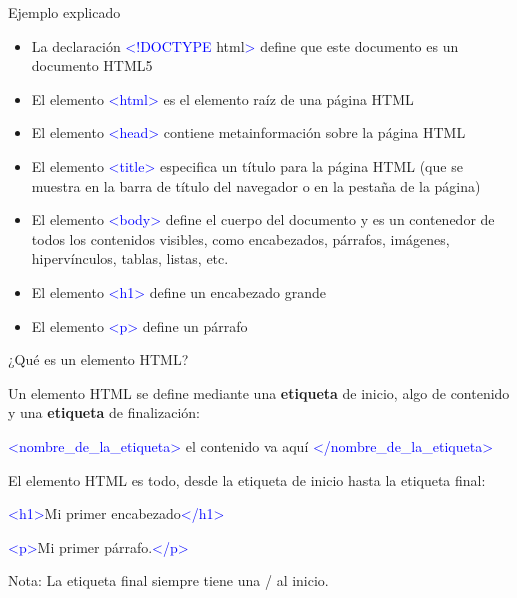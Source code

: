 \begin{frame}[c]{Ejemplo explicado}
  \begin{itemize}
    \item La declaración \textcolor{blue}{<!DOCTYPE} html\textcolor{blue}{>}
      define que este documento es un documento HTML5
    \pausa
    \item El elemento \textcolor{blue}{<html>} es el elemento raíz
      de una página HTML
    \pausa
    \item El elemento \textcolor{blue}{<head>} contiene metainformación
      sobre la página HTML
    \pausa
    \item El elemento \textcolor{blue}{<title>} especifica un título para
      la página HTML (que se muestra en la barra de título del navegador o
      en la pestaña de la página)
    \pausa
    \item El elemento \textcolor{blue}{<body>} define el cuerpo del
      documento y es un contenedor de todos los contenidos visibles, como
      encabezados, párrafos, imágenes, hipervínculos, tablas, listas, etc.
    \pausa
    \item El elemento \textcolor{blue}{<h1>} define un encabezado grande
    \pausa
    \item El elemento \textcolor{blue}{<p>} define un párrafo
  \end{itemize}
\end{frame}


\begin{frame}[c]{¿Qué es un elemento HTML?}

  Un elemento HTML se define mediante una \textbf{etiqueta} de inicio,
  algo de contenido y una \textbf{etiqueta} de finalización:

  \vspace{\baselineskip}
  \textcolor{blue}{<nombre\_de\_la\_etiqueta>} el contenido va aquí
  \textcolor{blue}{</nombre\_de\_la\_etiqueta>}

  \pausa
  \vspace{\baselineskip}
  El elemento HTML es todo, desde la etiqueta de inicio hasta la
  etiqueta final:

  \vspace{\baselineskip}
  \textcolor{blue}{<h1>}Mi primer encabezado\textcolor{blue}{</h1>}

  \vspace{\baselineskip}
  \textcolor{blue}{<p>}Mi primer párrafo.\textcolor{blue}{</p>}

  \begin{exampleblock}{Nota:}
    La etiqueta final siempre tiene una / al inicio.
  \end{exampleblock}

\end{frame}


